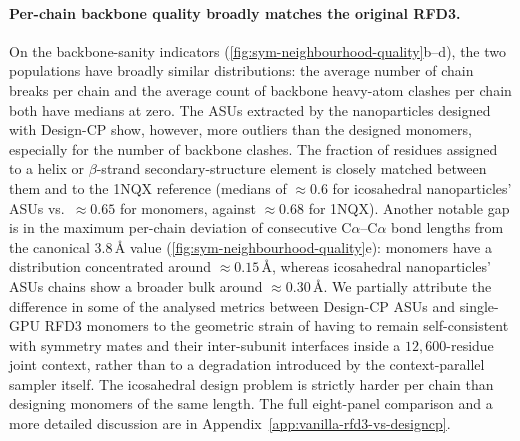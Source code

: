 \documentclass{article}
\theoremstyle{plain}
\theoremstyle{definition}
\theoremstyle{remark}
\begin{document}
\paragraph{Per-chain backbone quality broadly matches the original RFD3.} On the backbone-sanity indicators (\cref{fig:sym-neighbourhood-quality}b--d), the two populations have broadly similar distributions: the average number of chain breaks per chain and the average count of backbone heavy-atom clashes per chain both have medians at zero. The ASUs extracted by the nanoparticles designed with Design-CP show, however, more outliers than the designed monomers, especially for the number of backbone clashes. The fraction of residues assigned to a helix or $\beta$-strand secondary-structure element is closely matched between them and to the 1NQX reference (medians of $\approx 0.6$ for icosahedral nanoparticles' ASUs vs.\ $\approx 0.65$ for monomers, against $\approx 0.68$ for 1NQX). Another notable gap is in the maximum per-chain deviation of consecutive C$\alpha$--C$\alpha$ bond lengths from the canonical $3.8$\,\AA{} value (\cref{fig:sym-neighbourhood-quality}e): monomers have a distribution concentrated around $\approx 0.15$\,\AA{}, whereas icosahedral nanoparticles' ASUs chains show a broader bulk around $\approx 0.30$\,\AA{}. We partially attribute the difference in some of the analysed metrics between Design-CP ASUs and single-GPU RFD3 monomers to the geometric strain of having to remain self-consistent with symmetry mates and their inter-subunit interfaces inside a $12{,}600$-residue joint context, rather than to a degradation introduced by the context-parallel sampler itself. The icosahedral design problem is strictly harder per chain than designing monomers of the same length. The full eight-panel comparison and a more detailed discussion are in Appendix~\ref{app:vanilla-rfd3-vs-designcp}.
\end{document}
